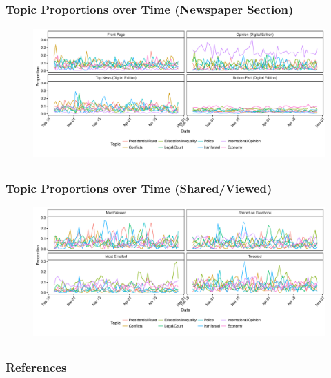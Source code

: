 \documentclass{beamer}
\begin{document}
\subsection{}
\begin{frame} %
  \frametitle{Topic Proportions over Time (Newspaper Section)}
  \begin{figure}
	\includegraphics[width = \textwidth]{../calc/fig/series_nyt.pdf}
  \end{figure}
\end{frame}

\subsection{}
\begin{frame} %
  \frametitle{Topic Proportions over Time (Shared/Viewed)}
  \begin{figure}
  \includegraphics[width = \textwidth]{../calc/fig/series_share.pdf}
  \end{figure}
\end{frame}


\subsection{}
\begin{frame}
  \frametitle{References}
  \def\newblock{\hskip .11em plus .33em minus .07em}
  \begin{scriptsize}
    
    
  \end{scriptsize}
\end{frame}
\end{document}
